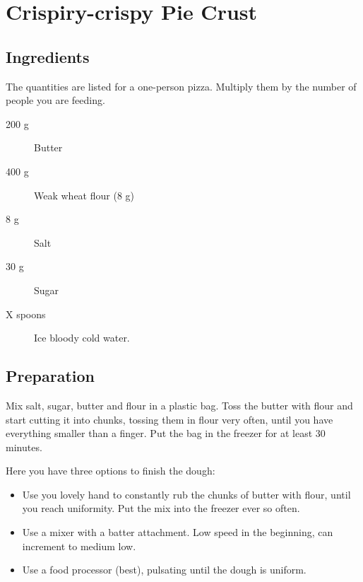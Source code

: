\setchapterpreamble[u]{\margintoc}
\chapter{Crispiry-crispy Pie Crust}

\section{Ingredients}
The quantities are listed for a one-person pizza. Multiply them by the number of people you are feeding.

\begin{multicols}{2}
\begin{description}
	\item[200 g] Butter
	\item[400 g] Weak wheat flour (8 g)
	\item[8 g] Salt
	\item[30 g] Sugar
	\item[X spoons] Ice bloody cold water.
\end{description}
\end{multicols}

\section{Preparation}
Mix salt, sugar, butter and flour in a plastic bag.
%
Toss the butter with flour and start cutting it into chunks, tossing them in flour very often, until you have everything smaller than a finger.
%
Put the bag in the freezer for at least $30$ minutes.

Here you have three options to finish the dough:
\begin{itemize}
	\item Use you lovely hand to constantly rub the chunks of butter with flour, until you reach uniformity. Put the mix into the freezer ever so often.
	\item Use a mixer with a batter attachment. Low speed in the beginning, can increment to medium low.
	\item Use a food processor (best), pulsating until the dough is uniform.
\end{itemize}


